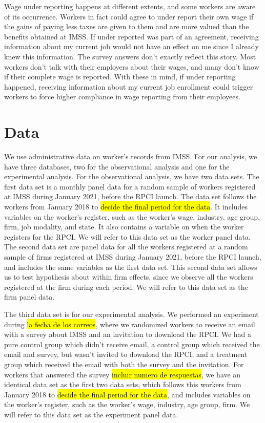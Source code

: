 \documentclass[oneside,11pt]{article}
\begin{document}
Wage under reporting happens at different extents, and some workers are aware of its occurrence. Workers in fact could agree to under report their own wage if the gains of paying less taxes are given to them and are more valued than the benefits obtained at IMSS. If under reported was part of an agreement, receiving information about my current job would not have an effect on me since I already knew this information. The survey answers don't exactly reflect this story. Most workers don't talk with their employers about their wages, and many don't know if their complete wage is reported. With these in mind, if under reporting happened, receiving information about my current job enrollment could trigger workers to force higher compliance in wage reporting from their employees.

\section{Data}

We use administrative data on worker's records from IMSS. For our analysis, we have three databases, two for the observational analysis and one for the experimental analysis. For the observational analysis, we have two data sets. The first data set is a monthly panel data for a random sample of workers registered at IMSS during January 2021, before the RPCI launch. The data set follows the workers from January 2018 to \hl{decide the final period for the data}. It includes variables on the worker's register, such as the worker's wage, industry, age group, firm, job modality, and state. It also contains a variable on when the worker registers for the RPCI. We will refer to this data set as the worker panel data. The second data set are panel data for all the workers registered at a random sample of firms registered at IMSS during January 2021, before the RPCI launch, and includes the same variables as the first data set. This second data set allows us to test hypothesis about within firm effects, since we observe all the workers registered at the firm during each period. We will refer to this data set as the firm panel data.

The third data set is for our experimental analysis. We performed an experiment during \hl{la fecha de los correos}, where we randomized workers to receive an email with a survey about IMSS and an invitation to download the RPCI. We had a pure control group which didn't receive email, a control group which received the email and survey, but wasn't invited to download the RPCI, and a treatment group which received the email with both the survey and the invitation. For workers that answered the survey \hl{incluir numero de respuestas}, we have an identical data set as the first two data sets, which follows this workers from January 2018 to \hl{decide the final period for the data}, and includes variables on the worker's register, such as the worker's wage, industry, age group, firm. We will refer to this data set as the experiment panel data.
\end{document}
